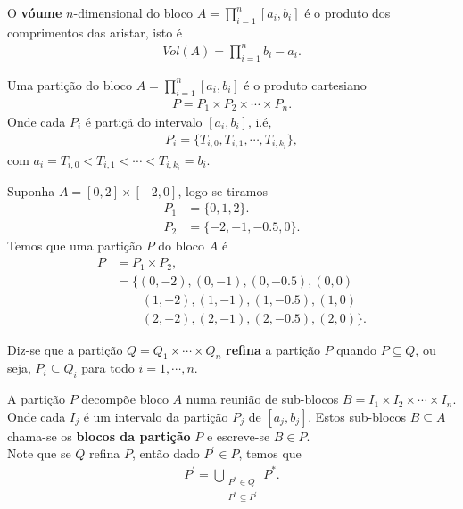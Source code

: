 \begin{definition}[Volúmen]
  O \textbf{vóume} $n$-dimensional do bloco $A=\prod_{i=1}^{n}[a_i,b_i]$ é o produto dos comprimentos das aristar, isto é
  \begin{align*}
    Vol(A)=\prod_{i=1}^{n}b_i-a_i.
  \end{align*}
\end{definition}
\begin{definition}[Partição]
  Uma partição do bloco $A=\prod_{i=1}^{n}[a_i,b_i]$ é o produto cartesiano
  \begin{align*}
    P=P_1\times P_2\times\cdots\times P_n.
  \end{align*}
  Onde cada $P_i$ é partiçã do intervalo $[a_i,b_i]$, i.é,
  \begin{align*}
    P_i=\{T_{i,0},T_{i,1},\cdots,T_{i,k_i}\},
  \end{align*}
  com $a_i=T_{i,0}<T_{i,1}<\cdots<T_{i,k_i}=b_i$.
\end{definition}
\begin{example}
  Suponha $A=[0,2]\times [-2,0]$, logo se tiramos
  \begin{align*}
    P_1&=\{0,1,2\}.\\
    P_2&=\{-2,-1,-0.5,0\}.
  \end{align*}
  Temos que uma partição $P$ do bloco $A$ é
  \begin{align*}
    P&=P_1\times P_2,\\
    &=\{(0,-2),(0,-1),(0,-0.5),(0,0)\\
    &\phantom{=-  }(1,-2),(1,-1),(1,-0.5),(1,0)\\
    &\phantom{=-  }(2,-2),(2,-1),(2,-0.5),(2,0)\}.
  \end{align*}
  \begin{center}
      
  \end{center}
\end{example}
\begin{definition}[Refinamento]
  Diz-se que a partição $Q=Q_1\times\cdots\times Q_n$ \textbf{refina} a partição $P$ quando $P\subseteq Q$, ou seja, $P_i\subseteq Q_i$ para todo $i=1,\cdots,n$. 
\end{definition}
\begin{note}
  A partição $P$ decompõe bloco $A$ numa reunião de sub-blocos $B=I_1\times I_2\times\cdots\times I_n$. Onde cada $I_j$ é um intervalo da partição $P_j$ de $[a_j,b_j]$. Estos sub-blocos $B\subseteq A$ chama-se os \textbf{blocos da partição} $P$ e escreve-se $B\in P$.\\
  Note que se $Q$ refina $P$, então dado $P^{\prime}\in P$, temos que 
  \begin{align*}
    P^{\prime}=\bigcup_{\substack{P^{\ast}\in Q\\P^{\ast}\subseteq P^{\prime}}}P^{\ast}.
  \end{align*}
\end{note}
